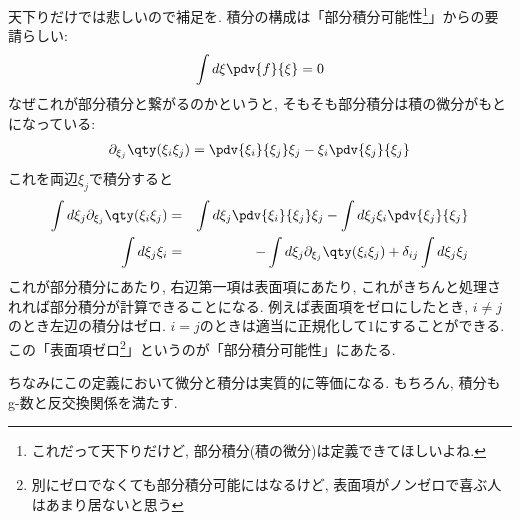 \documentclass[10.5pt,a4paper]{jreport}
\begin{document}
天下りだけでは悲しいので補足を. 積分の構成は「部分積分可能性\footnote{これだって天下りだけど, 部分積分(積の微分)は定義できてほしいよね. }」からの要請らしい:
\begin{eqnarray}
  \int d\xi \pdv{f}{\xi} = 0
\end{eqnarray}
なぜこれが部分積分と繋がるのかというと, そもそも部分積分は積の微分がもとになっている:
\begin{eqnarray}
  \partial_{\xi_j} \qty(\xi_i\xi_j) = \pdv{\xi_i}{\xi_j}\xi_j - \xi_i\pdv{\xi_j}{\xi_j}
\end{eqnarray}
これを両辺$\xi_j$で積分すると
\begin{eqnarray}
  \int d\xi_j\partial_{\xi_j} \qty(\xi_i\xi_j) &=& \int d\xi_j \pdv{\xi_i}{\xi_j}\xi_j - \int d\xi_j\xi_i\pdv{\xi_j}{\xi_j}\\
  \int d\xi_j\xi_i &=& -\int d\xi_j\partial_{\xi_j} \qty(\xi_i\xi_j) + \delta_{ij}\int d\xi_j \xi_j
\end{eqnarray}
これが部分積分にあたり, 右辺第一項は表面項にあたり, これがきちんと処理されれば部分積分が計算できることになる. 例えば表面項をゼロにしたとき, $i\neq j$のとき左辺の積分はゼロ. $i=j$のときは適当に正規化して$1$にすることができる. この「表面項ゼロ\footnote{別にゼロでなくても部分積分可能にはなるけど, 表面項がノンゼロで喜ぶ人はあまり居ないと思う}」というのが「部分積分可能性」にあたる.

ちなみにこの定義において微分と積分は実質的に等価になる. もちろん, 積分もg-数と反交換関係を満たす. 
\end{document}
